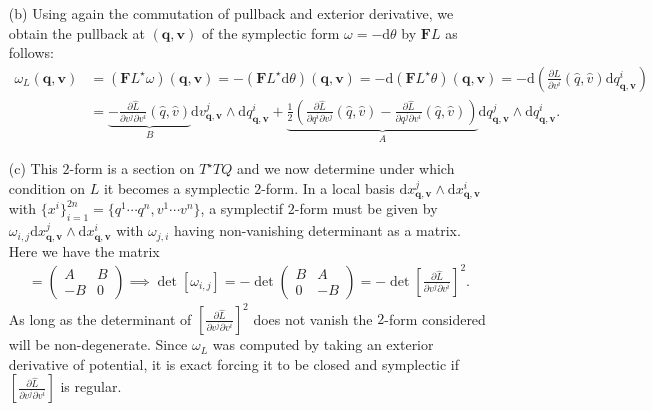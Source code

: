 \documentclass[10pt, a4paper]{article}
\begin{document}
{\begin{enumerate}
  \item[(b)] Using again the commutation of pullback and exterior derivative, we obtain the pullback at $(\mathbf{q}, \mathbf{v})$ of the symplectic form $\omega = -\text{d}\theta$ by $\mathbf{F}L$ as follows:
  \begin{align*}
    \omega_L(\mathbf{q}, \mathbf{v}) &= (\mathbf{F}L^{\star}\omega) (\mathbf{q}, \mathbf{v}) = -(\mathbf{F}L^{\star}\text{d}\theta) (\mathbf{q}, \mathbf{v}) =  -\text{d} (\mathbf{F}L^{\star}\theta) (\mathbf{q}, \mathbf{v}) = -\text{d} \left(\frac{\partial \hat{L}}{\partial v^i} (\hat{q}, \hat{v}) \text{d}q^{i}_{\mathbf{q}, \mathbf{v}}\right)\\
    &= \underbrace{-\frac{\partial \hat{L}}{\partial v^j \partial v^i} (\hat{q}, \hat{v})}_B  \text{d}v^{j}_{\mathbf{q}, \mathbf{v}} \wedge \text{d}q^{i}_{\mathbf{q}, \mathbf{v}} + \underbrace{\frac{1}{2}\left(\frac{\partial \hat{L}}{\partial q^i \partial v^j} (\hat{q}, \hat{v}) - \frac{\partial \hat{L}}{\partial q^j \partial v^i} (\hat{q}, \hat{v})\right)}_{A}\text{d}q^{j}_{\mathbf{q}, \mathbf{v}} \wedge \text{d}q^{i}_{\mathbf{q}, \mathbf{v}}.
  \end{align*}
  \item[(c)] This $2$-form is a section on $T^\star TQ$ and we now determine under which condition on $L$ it becomes a symplectic $2$-form. In a local basis $\text{d}x^{j}_{\mathbf{q}, \mathbf{v}} \wedge \text{d}x^{i}_{\mathbf{q}, \mathbf{v}}$ with $\{x^i\}_{i = 1}^{2n} = \{q^1 \cdots q^n, v^1 \cdots v^n\}$, a symplectif $2$-form must be given by $\omega_{i, j}\text{d}x^{j}_{\mathbf{q}, \mathbf{v}} \wedge \text{d}x^{i}_{\mathbf{q}, \mathbf{v}}$ with $\omega_{j, i}$ having non-vanishing determinant as a matrix. Here we have the matrix 
  \begin{align*}
    [\omega_{i, j}] = 
    \begin{pmatrix}
      A & B \\
      -B & 0
    \end{pmatrix}\implies \det [\omega_{i, j}] = -\det \begin{pmatrix}
      B & A\\
      0 & -B
    \end{pmatrix} = -\det \left[\frac{\partial \hat{L}}{\partial v^j \partial v^i}\right]^2.
  \end{align*}
  As long as the determinant of $\left[\frac{\partial \hat{L}}{\partial v^j \partial v^i}\right]^2$ does not vanish the $2$-form considered will be non-degenerate. Since $\omega_L$ was computed by taking an exterior derivative of potential, it is exact forcing it to be closed and symplectic if $\left[\frac{\partial \hat{L}}{\partial v^j \partial v^i}\right]$ is regular. 

\end{enumerate}}
\end{document}

